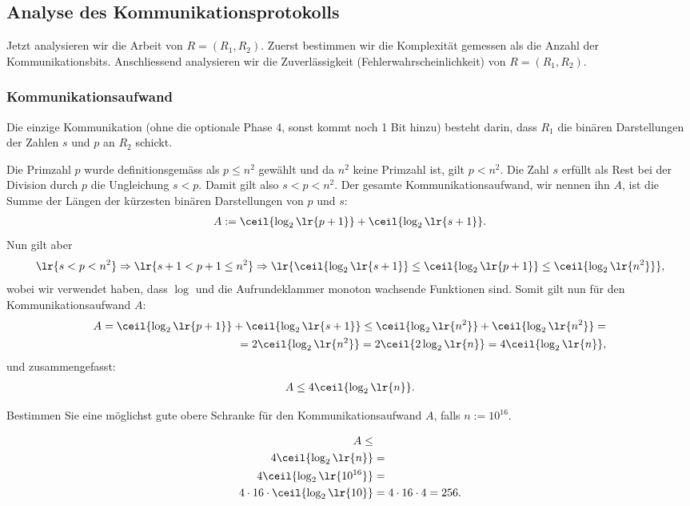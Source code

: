 \subsection{Analyse des Kommunikationsprotokolls}
Jetzt analysieren wir die Arbeit von $R = (R_1,R_2)$. Zuerst bestimmen wir die Komplexität gemessen als die Anzahl der Kommunikationsbits. Anschliessend analysieren wir die Zuverlässigkeit (Fehlerwahrscheinlichkeit) von $R = (R_1, R_2)$.
\subsubsection{Kommunikationsaufwand}
Die einzige Kommunikation (ohne die optionale Phase 4, sonst kommt noch 1 Bit hinzu) besteht darin, dass $R_1$ die binären Darstellungen der Zahlen $s$ und $p$ an $R_2$ schickt.

Die Primzahl $p$ wurde definitionsgemäss als $p \leq n^2$ gewählt und da $n^2$ keine Primzahl ist, gilt $p < n^2$. Die Zahl $s$ erfüllt als Rest bei der Division durch $p$ die Ungleichung $s < p$. Damit gilt also $s < p < n^2$. Der gesamte Kommunikationsaufwand, wir nennen ihn $A$, ist die Summe der Längen der kürzesten binären Darstellungen von $p$ und $s$:
\begin{align*}
	A := \ceil{\log_2\lr{p + 1}} + \ceil{\log_2\lr{s + 1}}.
\end{align*}
Nun gilt aber
\begin{align*}
	\lr{s < p < n^2} \Rightarrow \lr{s + 1 < p + 1 \leq n^2} \Rightarrow \lr{\ceil{\log_2\lr{s + 1}} \leq \ceil{\log_2\lr{p + 1}} \leq \ceil{\log_2\lr{n^2}}},
\end{align*}
wobei wir verwendet haben, dass $\log$ und die Aufrundeklammer monoton wachsende Funktionen sind. Somit gilt nun für den Kommunikationsaufwand $A$:
\begin{align*}
	A = \ceil{\log_2\lr{p + 1}} + \ceil{\log_2\lr{s + 1}} \leq \ceil{\log_2\lr{n^2}} + \ceil{\log_2\lr{n^2}} = \\
	= 2\ceil{\log_2\lr{n^2}} = 2\ceil{2\log_2\lr{n}} = 4\ceil{\log_2\lr{n}},
\end{align*}
und zusammengefasst:
\begin{align*}
	A \leq 4\ceil{\log_2\lr{n}}.
\end{align*}

\begin{myexercise}
	Bestimmen Sie eine möglichst gute obere Schranke für den Kommunikationsaufwand $A$, falls $n:=10^{16}$.
	\begin{myanswer}
		\begin{align*}
			A \leq                             &                           \\
			4\ceil{\log_2\lr{n}}               & =                         \\
			4\ceil{\log_2\lr{10^{16}}}         & =                         \\
			4\cdot 16\cdot\ceil{\log_2\lr{10}} & = 4\cdot 16\cdot 4 = 256.
		\end{align*}
	\end{myanswer}
\end{myexercise}

